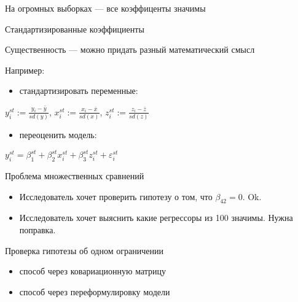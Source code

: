 \documentclass[ignorenonframetext,]{beamer}
\begin{document}
\begin{frame}{На огромных выборках --- все коэффиценты значимы}

\end{frame}

\begin{frame}{Стандартизированные коэффициенты}

Существенность --- можно придать разный математический смысл

Например:

\begin{itemize}
\itemsep1pt\parskip0pt
\item
  стандартизировать переменные:
\end{itemize}

$y^{st}_i:= \frac{y_i-\bar{y}}{sd(y)}$,
$x^{st}_i:= \frac{x_i-\bar{x}}{sd(x)}$,
$z^{st}_i:= \frac{z_i-\bar{z}}{sd(z)}$

\begin{itemize}
\itemsep1pt\parskip0pt
\item
  переоценить модель:
\end{itemize}

$y^{st}_i=\beta_1^{st}+\beta_2^{st}x_i^{st}+\beta_3^{st}z_i^{st}+\varepsilon_i^{st}$

\end{frame}

\begin{frame}{Проблема множественных сравнений}

\begin{itemize}
\item
  Исследователь хочет проверить гипотезу о том, что $\beta_{42}=0$. Ok.
\item
  Исследователь хочет выяснить какие регрессоры из 100 значимы. Нужна
  поправка.
\end{itemize}

\end{frame}

\begin{frame}{Проверка гипотезы об одном ограничении}

\begin{itemize}
\item
  способ через ковариационную матрицу
\item
  способ через переформулировку модели
\end{itemize}

\end{frame}
\end{document}
